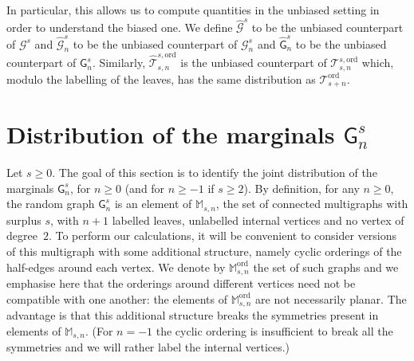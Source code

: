 \documentclass[AHL,Unicode,longabstracts,published]{cedram}
\newcommand{\intervalle}[4]{\mathopen{#1}#2
\mathclose{}\mathpunct{},#3
\mathclose{#4}}
\newcommand{\intervalleff}[2]{\intervalle{[}{#1}{#2}{]}}
\newcommand{\E}[1]{\ensuremath{\mathbb{E} \left[#1 \right]}}
\newcommand{\ord}{\mathrm{ord}}
\newcommand{\cG}{\mathcal{G}}
\newcommand{\cT}{\mathcal{T}}
\newcommand{\sG}{\mathsf{G}}
\newcommand{\M}{\mathbb{M}}
\begin{document}
In particular, this allows us to compute quantities in the unbiased setting in order to understand the biased one. We define $\widehat{\cG}^s$ to be the unbiased counterpart of $\cG^s$ and $\widehat{\cG}^s_n$ to be the unbiased counterpart of $\cG^s_n$ and $\widehat{\sG}^s_n$ to be the unbiased counterpart of $\sG_n^s$. Similarly, $\widehat{\cT}_{s,n}^{s,\ord}$ is the unbiased counterpart of $\cT_{s,n}^{s,\ord}$ which, modulo the labelling of the leaves, has the same distribution as $\cT_{s+n}^{\ord}$.



\section{Distribution of the marginals \texorpdfstring{$\sG_{n}^s$}{mathsfGns}}\label{sec:marginals}

Let $s \geq 0$. The goal of this section is to identify the joint distribution of the marginals $\sG^s_{n}$, for $n \geq 0$ (and for $n \ge -1$ if $s \ge 2$). By definition, for any $n \geq 0$, the random graph $\sG^s_{n}$ is an element of $\M_{s,n}$, the set of connected multigraphs with surplus $s$, with $n+1$ labelled leaves, unlabelled internal vertices and no vertex of degree~$2$. To perform our calculations, it will be convenient to consider versions of this multigraph with some additional structure, namely cyclic orderings of the half-edges around each vertex. We denote by $\M_{s,n}^{\ord}$ the set of such graphs and we emphasise here that the orderings around different vertices need not be compatible with one another: the elements of $\M^{\ord}_{s,n}$ are not necessarily planar. The advantage is that this additional structure breaks the symmetries present in elements of $\M_{s,n}$. (For $n=-1$ the cyclic ordering is insufficient to break all the symmetries and we will rather label the internal vertices.)
\end{document}
